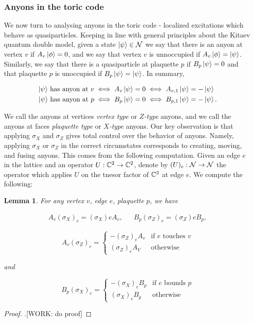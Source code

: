 \documentclass{article}
\newtheorem{lemma}{Lemma}[section]
\theoremstyle{definition}
\numberwithin{figure}{section}
\begin{document}
\subsubsection{Anyons in the toric code}

We now turn to analysing anyons in the toric code - localized excitations which behave as quasiparticles. Keeping in line with general principles about the Kitaev quantum double model, given a state $\ket{\psi}\in \mathcal{N}$ we say that there is an anyon at vertex $v$ if $A_v\ket{\phi}=0$, and we say that vertex $v$ is unnoccupied if $A_v\ket{\phi}=\ket{\psi}$. Similarly, we say that there is a quasiparticle at plaquette $p$ if $B_p\ket{\psi}=0$ and that plaquette $p$ is unoccupied if $B_p\ket{\psi}=\ket{\psi}$. In summary,

\begin{align*}
\text{$\ket{\psi}$ has anyon at $v$}\iff A_v\ket{\psi}&=0 \iff A_{v,1}\ket{\psi}=-\ket{\psi}\\
\text{$\ket{\psi}$ has anyon at $p$}\iff B_p\ket{\psi}&=0 \iff B_{p,1}\ket{\psi}=-\ket{\psi}.
\end{align*}

We call the anyons at vertices \textit{vertex type} or \textit{$Z$-type} anyons, and we call the anyons at faces \textit{plaquette type} or \textit{$X$-type} anyons. Our key observation is that applying $\sigma_X$ and $\sigma_Z$ gives total control over the behavior of anyons. Namely, applying $\sigma_X$ or $\sigma_Z$ in the correct circumstates corresponds to creating, moving, and fusing anyons. This comes from the following computation. Given an edge $e$ in the lattice and an operator $U:\mathbb{C}^2\to \mathbb{C}^2$, denote by $(U)_e:\mathcal{N}\to\mathcal{N}$ the operator which applies $U$ on the tnesor factor of $\mathbb{C}^2$ at edge $e$. We compute the following:

\begin{lemma} For any vertex $v$, edge $e$, plaquette $p$, we have

\begin{align*}
A_v  (\sigma_X)_e=(\sigma_X)e A_v, && B_p (\sigma_Z)_e=(\sigma_Z)e B_p,
\end{align*}

\begin{equation*}
A_v (\sigma_Z)_e=
\begin{cases}
- (\sigma_Z)_e A_v & \text{if $e$ touches $v$}\\
(\sigma_Z)_e A_V & \text{otherwise}
\end{cases}
\end{equation*}

and

\begin{equation*}
B_p (\sigma_X)_e=
\begin{cases}
- (\sigma_X)_e B_p & \text{if $e$ bounds $p$}\\
(\sigma_X)_e B_p & \text{otherwise}
\end{cases}
\end{equation*}


\end{lemma}
\begin{proof}.[WORK: do proof]
\end{proof}
\end{document}
